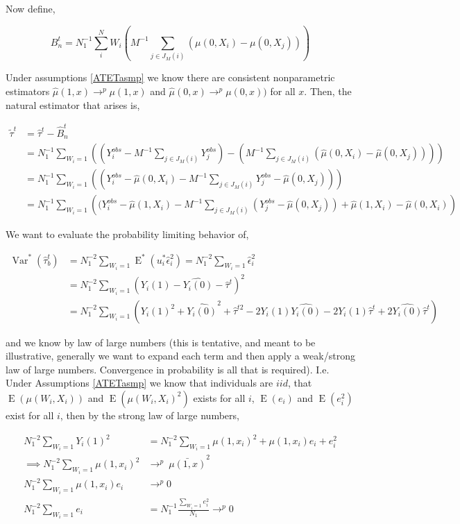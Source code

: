 \documentclass{article}
\DeclareMathOperator{\E}{E}
\DeclareMathOperator{\Var}{Var}
\newcommand{\Nt}{N_{1}^{-2}}
\newcommand{\hta}{\hat \tau^{t}}
\newcommand{\htb}{\hat \tau_{b}^{t}}
\newcommand{\he}{\hat{\epsilon}_{i}}
\begin{document}
Now define, 

$$B_{n}^{t} = N_{1}^{-1}\sum_{i}^{N}W_{i}\left(M^{-1}\sum_{j \in J_{M}(i)}(\mu(0,X_{i}) - \mu(0,X_{j}))\right)$$

Under assumptions \ref{ATETasmp} we know there are consistent nonparametric estimators $\hat \mu(1,x) \to^{p} \mu(1,x)$ and $\hat \mu(0,x) \to^{p} \mu(0,x))$ for all $x$. Then, the natural estimator that arises is,

\begin{align*}\tilde \tau^{t} &= \hat\tau^{t}-\hat B_{n}^{t} \\
&= N_{1}^{-1}\sum_{W_{i} = 1}\left((Y_{i}^{obs} -M^{-1}\sum_{j \in J_{M}(i)}Y_{j}^{obs})-\left(M^{-1}\sum_{j \in J_{M}(i)}(\hat \mu(0,X_{i}) - \hat \mu(0,X_{j}))\right)\right) \\
&= N_{1}^{-1}\sum_{W_{i} = 1}\left((Y_{i}^{obs}-\hat \mu(0,X_{i}) -M^{-1}\sum_{j \in J_{M}(i)}Y_{j}^{obs}-\hat \mu(0,X_{j}))\right) \\
&= N_{1}^{-1}\sum_{W_{i} = 1}\left((Y_{i}^{obs}-\hat \mu(1,X_{i}) -M^{-1}\sum_{j \in J_{M}(i)}(Y_{j}^{obs}-\hat \mu(0,X_{j}))+\hat \mu(1,X_{i})-\hat \mu(0,X_{i})\right)
\end{align*}

We want to evaluate the probability limiting behavior of,

\begin{align*} \Var^{*}(\htb) &= N_{1}^{-2}\sum_{W_{i}=1}\E^{*}(u_{i}^{*}\he^{2})= N_{1}^{-2}\sum_{W_{i}=1}\he^{2} \\
&= \Nt \sum_{W_{i}=1}(Y_{i}(1)-\hat{Y_{i}(0)}-\hta)^{2} \\
&= \Nt \sum_{W_{i} = 1}(Y_{i}(1)^{2}+\hat{Y_{i}(0)}^{2}+\hat \tau^{t2}-2Y_{i}(1)\hat{Y_{i}(0)}-2Y_{i}(1)\hta+2\hat{Y_{i}(0)}\hta)
\end{align*}

and we know by law of large numbers (this is tentative, and meant to be illustrative, generally we want to expand each term and then apply a weak/strong law of large numbers. Convergence in probability is all that is required). I.e. Under Assumptions \ref{ATETasmp} we know that individuals are $iid$, that $\E(\mu(W_{i},X_{i}))$ and $\E(\mu(W_{i},X_{i})^{2})$ exists for all $i$, $\E(e_{i})$ and $\E(e_{i}^{2})$ exist for all $i$, then by the strong law of large numbers, 

\begin{align*}
\Nt \sum_{W_{i}=1}Y_{i}(1)^{2} &= \Nt \sum_{W_{i}=1}\mu(1,x_{i})^{2}+\mu(1,x_{i})e_{i}+e_{i}^{2}\\
\implies \Nt \sum_{W_{i}=1}\mu(1,x_{i})^{2} &\to^{p}\ \bar{\mu(1,x)}^{2} \\
\Nt \sum_{W_{i}=1}\mu(1,x_{i})e_{i} &\to^{p} 0 \\
\Nt \sum_{W_{i}=1} e_{i} &= N_{1}^{-1}\frac{\sum_{W_{i}=1}e_{i}^{2}}{N_{1}} \to^{p} 0 \\
\end{align*}
\end{document}
